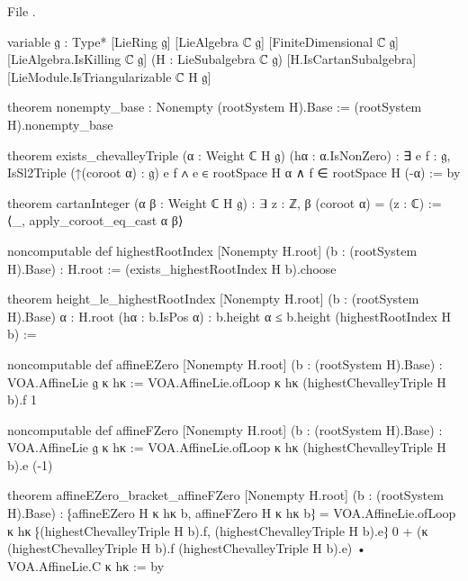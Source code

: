 File .
\begin{leancode}
variable {𝔤 : Type*} [LieRing 𝔤] [LieAlgebra ℂ 𝔤] [FiniteDimensional ℂ 𝔤]
  [LieAlgebra.IsKilling ℂ 𝔤]
  (H : LieSubalgebra ℂ 𝔤) [H.IsCartanSubalgebra] [LieModule.IsTriangularizable ℂ H 𝔤]

theorem nonempty_base : Nonempty (rootSystem H).Base :=
  (rootSystem H).nonempty_base

theorem exists_chevalleyTriple (α : Weight ℂ H 𝔤) (hα : α.IsNonZero) :
    ∃ e f : 𝔤, IsSl2Triple (↑(coroot α) : 𝔤) e f ∧ e ∈ rootSpace H α ∧ f ∈ rootSpace H (-α) := by

theorem cartanInteger (α β : Weight ℂ H 𝔤) :
    ∃ z : ℤ, β (coroot α) = (z : ℂ) :=
  ⟨_, apply_coroot_eq_cast α β⟩

noncomputable def highestRootIndex [Nonempty H.root] (b : (rootSystem H).Base) : H.root :=
  (exists_highestRootIndex H b).choose

theorem height_le_highestRootIndex [Nonempty H.root] (b : (rootSystem H).Base)
    {α : H.root} (hα : b.IsPos α) : b.height α ≤ b.height (highestRootIndex H b) :=

noncomputable def affineEZero [Nonempty H.root] (b : (rootSystem H).Base) :
    VOA.AffineLie 𝔤 κ hκ :=
  VOA.AffineLie.ofLoop κ hκ (highestChevalleyTriple H b).f 1

noncomputable def affineFZero [Nonempty H.root] (b : (rootSystem H).Base) :
    VOA.AffineLie 𝔤 κ hκ :=
  VOA.AffineLie.ofLoop κ hκ (highestChevalleyTriple H b).e (-1)

theorem affineEZero_bracket_affineFZero [Nonempty H.root] (b : (rootSystem H).Base) :
    ⁅affineEZero H κ hκ b, affineFZero H κ hκ b⁆ =
      VOA.AffineLie.ofLoop κ hκ ⁅(highestChevalleyTriple H b).f,
        (highestChevalleyTriple H b).e⁆ 0 +
      (κ (highestChevalleyTriple H b).f (highestChevalleyTriple H b).e) •
        VOA.AffineLie.C κ hκ := by
\end{leancode}

